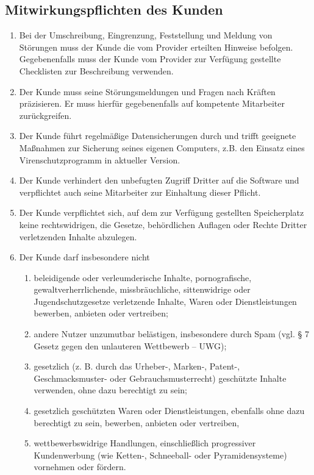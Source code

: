 \documentclass{terms}
\begin{document}
\subsection{Mitwirkungspflichten des Kunden}
\begin{enumerate}
\item Bei der Umschreibung, Eingrenzung, Feststellung und Meldung von Störungen muss der Kunde die vom Provider erteilten Hinweise befolgen.
      Gegebenenfalls muss der Kunde vom Provider zur Verfügung gestellte Checklisten zur Beschreibung verwenden.
\item Der Kunde muss seine Störungsmeldungen und Fragen nach Kräften präzisieren.
      Er muss hierfür gegebenenfalls auf kompetente Mitarbeiter zurückgreifen.
\item Der Kunde führt regelmäßige Datensicherungen durch und trifft geeignete Maßnahmen zur Sicherung seines eigenen Computers, z.B. den Einsatz eines Virenschutzprogramm in aktueller Version.
\item Der Kunde verhindert den unbefugten Zugriff Dritter auf die Software und verpflichtet auch seine Mitarbeiter zur Einhaltung dieser Pflicht.
\item Der Kunde verpflichtet sich, auf dem zur Verfügung gestellten Speicherplatz keine rechtswidrigen, die Gesetze, behördlichen Auflagen oder Rechte Dritter verletzenden Inhalte abzulegen.
\item Der Kunde darf insbesondere nicht \begin{enumerate}
\item beleidigende oder verleumderische Inhalte, pornografische, gewaltverherrlichende, missbräuchliche, sittenwidrige oder Jugendschutzgesetze verletzende Inhalte, Waren oder Dienstleistungen bewerben, anbieten oder vertreiben;
\item andere Nutzer unzumutbar belästigen, insbesondere durch Spam (vgl. § 7 Gesetz gegen den unlauteren Wettbewerb – UWG);
\item gesetzlich (z. B. durch das Urheber-, Marken-, Patent-, Geschmacksmuster- oder Gebrauchsmusterrecht) geschützte Inhalte verwenden, ohne dazu berechtigt zu sein;
\item gesetzlich geschützten Waren oder Dienstleistungen, ebenfalls ohne dazu berechtigt zu sein, bewerben, anbieten oder vertreiben,
\item wettbewerbswidrige Handlungen, einschließlich progressiver Kundenwerbung (wie Ketten-, Schneeball- oder Pyramidensysteme) vornehmen oder fördern.
\end{enumerate}

\end{enumerate}
\end{document}
